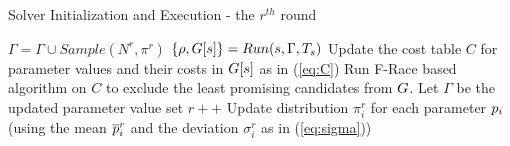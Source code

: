\begin{algorithm}
\caption{Solver Initialization and Execution - the $r^{th} $ round \label{algoFals}}
\begin{algorithmic}
  \State {}
  \State $\Gamma  = \Gamma  \cup  Sample(N^{r}, \pi^r)$
   \State
  \ForAll{$\solver \in \solverset$} 
     \State {}    
      \State $\{ \rho, G[s] \} = Run(s, \Gamma, T_{s})$    
      \State  Update the cost table $C$ for parameter values and their costs in $G[s]$ as in (\ref{eq:C})
     \EndFor
   \State
   \State Run F-Race based algorithm on $C$ to exclude the least promising candidates from $G$. 
   \State Let $\Gamma$ be the updated parameter value set 
   \State
  \State $r++$  %
  \State Update distribution $\pi_i^r$ for each parameter $p_i$ (using the mean $\overline{p}^r_i$ and the deviation $\sigma^r_i$ as in (\ref{eq:sigma}))
\end{algorithmic}
\end{algorithm}



